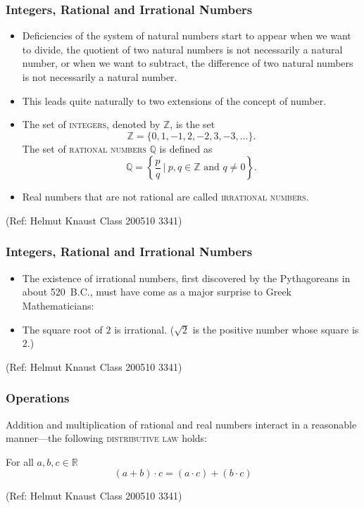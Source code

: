  \begin{frame}[fragile]\frametitle{Integers, Rational and Irrational Numbers}
\begin{itemize}
\item Deficiencies of the system of natural numbers start to appear
when we want to divide, the quotient of two natural numbers is
not necessarily a natural number, or when we want to
subtract, the difference of two natural numbers is not
necessarily a natural number. 
\item This leads quite naturally to two
extensions of the concept of number.
\item The set of \textsc{integers}, denoted by $\mathbb{Z}$, is the set
\[{\mathbb{Z}}=\{0,1,-1,2,-2,3,-3,\ldots\}.\]
The set of \textsc{rational numbers} $\mathbb{Q}$ is defined as
\[\mathbb{Q}=\left\{\frac{p}{q} \ \left|\ p,q\in\mathbb{Z}\mbox{ and }
q\not=0\right.\right\}.\]
\item Real numbers that are not rational are called \textsc{irrational
numbers}. 
\end{itemize}

\tiny{(Ref: Helmut Knaust Class 200510 3341)}

\end{frame}

 \begin{frame}[fragile]\frametitle{Integers, Rational and Irrational Numbers}
\begin{itemize}
\item The existence of irrational numbers, first discovered by
the Pythagoreans in about 520~B.C.,  must have come as a major
surprise to Greek Mathematicians:
\item The
square root of $2$ is irrational. ($\sqrt{2}$ is the positive
number whose square is $2$.)

\end{itemize}

\tiny{(Ref: Helmut Knaust Class 200510 3341)}

\end{frame}


 \begin{frame}[fragile]\frametitle{Operations}
 
 Addition and multiplication of rational and real numbers interact
in a reasonable manner---the following \textsc{distributive law}
holds:

For all $a,b,c \in \mathbb{R}$
\[(a+b)\cdot c= (a\cdot c) + (b\cdot c)\]


\tiny{(Ref: Helmut Knaust Class 200510 3341)}

\end{frame}